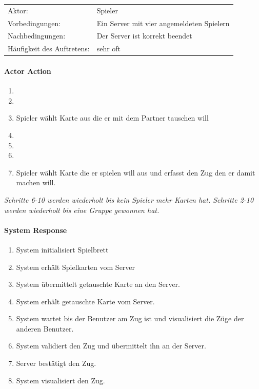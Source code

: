 \documentclass[a4paper,12pt,halfparskip,DIV14]{scrartcl}
\begin{document}
\begin{tabular}{@{} l l @{}}
	Aktor:       											&	Spieler \\
	Vorbedingungen:										& Ein Server mit vier angemeldeten Spielern \\
	Nachbedingungen:									& Der Server ist korrekt beendet \\
	Häufigkeit des Auftretens:				& sehr oft \\
\end{tabular}
\newpage
\begin{multicols}{2}
\raggedcolumns
\paragraph{Actor Action}
\begin{enumerate}
	\item[]
	\item[]
	\item[3] Spieler wählt Karte aus die er mit dem Partner tauschen will
	\item[]
	\item[]
	\item[]
	\item[7] Spieler wählt Karte die er spielen will aus und erfasst den Zug den er damit machen will.
\end{enumerate}
\emph{Schritte 6-10 werden wiederholt bis kein Spieler mehr Karten hat.\newline
Schritte 2-10 werden wiederholt bis eine Gruppe gewonnen hat.}
\columnbreak
\paragraph{System Response}
\begin{enumerate}
	\item[1] System initialisiert Spielbrett
	\item[2] System erhält Spielkarten vom Server
	\item[4] System übermittelt getauschte Karte an den Server.
	\item[5] System erhält getauschte Karte vom Server.
	\item[6] System wartet bis der Benutzer am Zug ist und visualisiert die Züge der anderen Benutzer.
	\item[8] System validiert den Zug und übermittelt ihn an der Server.
  \item[9] Server bestätigt den Zug.
  \item[10] System visualisiert den Zug.
\end{enumerate}
\end{multicols}
\end{document}

